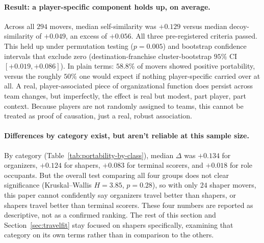 \documentclass[11pt]{article}
\begin{document}
\paragraph{Result: a player-specific component holds up, on average.}
Across all $294$ movers, median self-similarity was $+0.129$ versus median
decoy-similarity of $+0.049$, an excess of $+0.056$. All three pre-registered criteria
passed. This held up under permutation testing ($p=0.005$) and bootstrap confidence
intervals that exclude zero (destination-franchise cluster-bootstrap $95\%$ CI
$[+0.019,+0.086]$). In plain terms: $58.8\%$ of movers showed positive portability, versus
the roughly $50\%$ one would expect if nothing player-specific carried over at all. A
real, player-associated piece of organizational function does persist across team changes,
but imperfectly, the effect is real but modest, part player, part context. Because players
are not randomly assigned to teams, this cannot be treated as proof of causation, just a
real, robust association.

\paragraph{Differences by category exist, but aren't reliable at this sample size.}
By category (Table~\ref{tab:portability-by-class}), median $\Delta$ was $+0.134$ for
organizers, $+0.124$ for shapers, $+0.083$ for terminal scorers, and $+0.018$ for role
occupants. But the overall test comparing all four groups does not clear significance
(Kruskal--Wallis $H=3.85$, $p=0.28$), so with only $24$ shaper movers, this paper cannot
confidently say organizers travel better than shapers, or shapers travel better than
terminal scorers. These four numbers are reported as descriptive, not as a confirmed
ranking. The rest of this section and Section~\ref{sec:travelfit} stay focused on shapers
specifically, examining that category on its own terms rather than in comparison to the
others.
\end{document}
